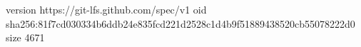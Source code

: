 version https://git-lfs.github.com/spec/v1
oid sha256:81f7cd030334b6ddb24e835fcd221d2528c1d4b9f51889438520cb55078222d0
size 4671
